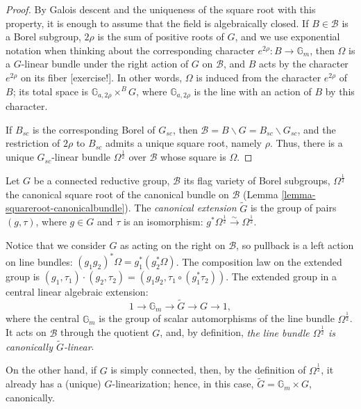 \begin{proof}
By Galois descent and the uniqueness of the square root with this property, it is enough to assume that the field is algebraically closed. If $B\in \mathcal B$ is a Borel subgroup, $2\rho$ is the sum of positive roots of $G$, and we use exponential notation when thinking about the corresponding character $e^{2\rho}:B\to \mathbb G_m$, then $\Omega$ is a $G$-linear bundle under the right action of $G$ on $\mathcal B$, and $B$ acts by the character $e^{2\rho}$ on its fiber [exercise!]. In other words, $\Omega$ is induced from the character $e^{2\rho}$ of $B$; its total space is $\mathbb G_{a,2\rho} \times^B G$,
where $\mathbb G_{a,2\rho}$ is the line with an action of $B$ by this character.

If $B_{sc}$ is the corresponding Borel of $G_{sc}$, then $\mathcal B = B\backslash G=B_{sc}\backslash G_{sc}$, and the restriction of $2\rho$ to $B_{sc}$ admits a unique square root, namely $\rho$. Thus, there is a unique $G_{sc}$-linear bundle $\Omega^{\frac{1}{2}}$ over $\mathcal B$ whose square is $\Omega$.
\end{proof}



\begin{definition}
 \label{definition-canonical-extension}
Let $G$ be a connected reductive group, $\mathcal B$ its flag variety of Borel subgroups, $\Omega^\frac{1}{2}$ the canonical square root of the canonical bundle on $\mathcal B$ (Lemma \ref{lemma-squareroot-canonicalbundle}). The {\it canonical extension} $\tilde G$ is the group of pairs $(g,\tau)$, where $g\in G$ and $\tau$ is an isomorphism: $g^*\Omega^\frac{1}{2}\xrightarrow\sim \Omega^\frac{1}{2}$.
\end{definition}

\begin{remark}
 \label{remark-canonical-extension}
Notice that we consider $G$ as acting on the right on $\mathcal B$, so pullback is a left action on line bundles: $(g_1g_2)^*\Omega = g_1^*(g_2^*\Omega)$. The composition law on the extended group is $(g_1,\tau_1)\cdot (g_2,\tau_2) = (g_1g_2, \tau_1\circ(g_1^*\tau_2))$. The extended group in a central linear algebraic extension:
\begin{equation}
\label{equation-canonical-extension} 1\to \mathbb G_m \to \tilde G \to G \to 1,
\end{equation}
where the central $\mathbb G_m$ is the group of scalar automorphisms of the line bundle $\Omega^\frac{1}{2}$. It acts on $\mathcal B$ through the quotient $G$, and, by definition, \emph{the line bundle $\Omega^\frac{1}{2}$ is canonically $\tilde G$-linear}.

On the other hand, if $G$ is simply connected, then, by the definition of $\Omega^\frac{1}{2}$, it already has a (unique) $G$-linearization; hence, in this case, $\tilde G = \mathbb G_m \times G$, canonically.
\end{remark}


